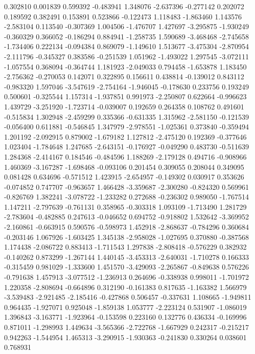 0.302810
0.001839
0.599392
-0.483941
1.348076
-2.637396
-0.277142
0.202072
0.189592
0.382491
0.153891
0.523866
-0.122473
1.118483
-1.863460
1.143576
-2.583104
0.113540
-0.307369
1.004506
-1.476707
1.427697
-3.295875
-1.930249
-0.360329
0.366052
-0.186294
0.884941
-1.258735
1.590689
-3.468468
-2.745658
-1.734406
0.222134
-0.094384
0.869079
-1.149610
1.513677
-3.475304
-2.870954
-2.111796
-0.345327
0.383586
-0.251539
1.051962
-1.493022
1.297545
-3.072111
-1.057554
0.368094
-0.364744
1.181923
-2.049033
0.794458
-1.653878
1.183450
-2.756362
-0.270053
0.142071
0.322895
0.156611
0.438814
-0.139012
0.843112
-0.983320
1.597046
-3.547619
-2.754164
-1.946045
-0.178630
0.233756
0.193249
0.500601
-0.325544
1.157314
-1.937851
0.991973
-2.250807
0.622664
-0.996623
1.439729
-3.251920
-1.723714
-0.039007
0.192659
0.264358
0.108762
0.491601
-0.515834
1.302948
-2.459299
0.335366
-0.631335
1.315962
-2.581150
-0.121539
-0.056400
0.611881
-0.546845
1.347979
-2.978551
-1.025361
0.373840
-0.359494
1.201192
-2.092915
0.879002
-1.679182
1.127812
-2.475120
0.192369
-0.377646
1.023404
-1.784648
1.247685
-2.643151
-0.176927
-0.049290
0.483730
-0.511639
1.284368
-2.414167
0.184546
-0.484596
1.188269
-2.179128
0.494716
-0.908966
1.460369
-3.167287
-1.698468
-0.093106
0.201454
0.309055
0.208044
0.349095
0.081428
0.634696
-0.571512
1.423915
-2.654957
-0.149302
0.030917
0.353626
-0.074852
0.747707
-0.963657
1.466428
-3.359687
-2.300280
-0.824320
0.569961
-0.826769
1.382241
-3.078722
-1.233282
0.272688
-0.236302
0.989050
-1.767514
1.147211
-2.797639
-0.761131
0.358965
-0.303318
1.093109
-1.713490
1.281729
-2.783604
-0.482885
0.247613
-0.046652
0.694752
-0.918802
1.532642
-3.369952
-2.160861
-0.663915
0.590576
-0.598973
1.452918
-2.868637
-0.784296
0.360684
-0.203146
1.067926
-1.603425
1.345138
-2.958028
-1.027695
0.370880
-0.387568
1.174438
-2.086722
0.883413
-1.711543
1.297838
-2.808418
-0.576229
0.382932
-0.140262
0.873299
-1.267144
1.440145
-3.453313
-2.640031
-1.710278
0.166333
-0.315459
0.981029
-1.333600
1.451570
-3.429093
-2.265867
-0.849638
0.576226
-0.791638
1.457913
-3.077512
-1.236913
0.264696
-0.338938
0.998011
-1.701972
1.220358
-2.808694
-0.664896
0.312190
-0.161383
0.817635
-1.163382
1.566979
-3.539483
-2.921485
-2.185416
-0.427868
0.506457
-0.337631
1.108665
-1.949811
0.964435
-1.927071
0.925048
-1.859138
1.053777
-2.223124
0.531907
-1.086019
1.396843
-3.163771
-1.923964
-0.153598
0.223160
0.132776
0.436334
-0.169996
0.871011
-1.298993
1.449634
-3.565366
-2.722768
-1.667929
0.242317
-0.215217
0.942263
-1.544954
1.465313
-3.290915
-1.930363
-0.241830
0.330264
0.038601
0.768931
